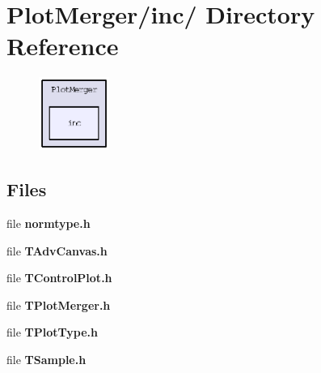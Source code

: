 \section{Plot\-Merger/inc/ Directory Reference}
\label{dir_06db2ee6942b22d06095611cbe6c839d}


\begin{figure}[H]
\begin{center}
\leavevmode
\includegraphics[width=65pt]{dir_06db2ee6942b22d06095611cbe6c839d_dep}
\end{center}
\end{figure}
\subsection*{Files}
\begin{CompactItemize}
\item 
file \textbf{normtype.h}
\item 
file \textbf{TAdv\-Canvas.h}
\item 
file \textbf{TControl\-Plot.h}
\item 
file \textbf{TPlot\-Merger.h}
\item 
file \textbf{TPlot\-Type.h}
\item 
file \textbf{TSample.h}
\end{CompactItemize}
